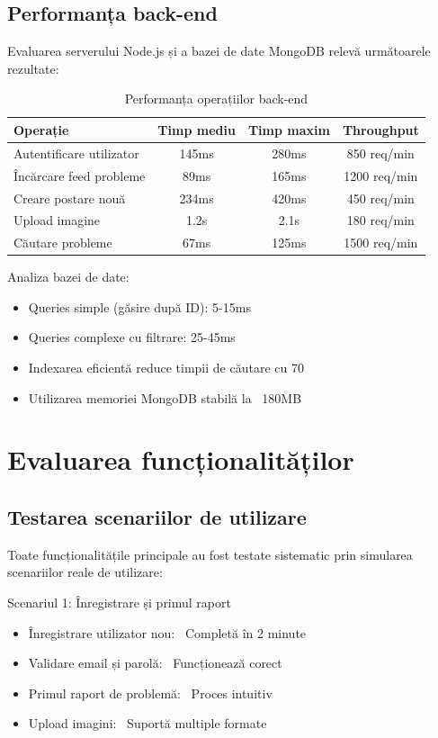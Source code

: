 \documentclass[12pt,a4paper]{report}
\begin{document}
\subsection{Performanța back-end}

Evaluarea serverului Node.js și a bazei de date MongoDB relevă următoarele rezultate:

\begin{table}[H]
\centering
\caption{Performanța operațiilor back-end}
\label{tab:backend_performance}
\begin{tabular}{|l|c|c|c|}
\hline
\textbf{Operație} & \textbf{Timp mediu} & \textbf{Timp maxim} & \textbf{Throughput} \\
\hline
Autentificare utilizator & 145ms & 280ms & 850 req/min \\
\hline
Încărcare feed probleme & 89ms & 165ms & 1200 req/min \\
\hline
Creare postare nouă & 234ms & 420ms & 450 req/min \\
\hline
Upload imagine & 1.2s & 2.1s & 180 req/min \\
\hline
Căutare probleme & 67ms & 125ms & 1500 req/min \\
\hline
\end{tabular}
\end{table}

Analiza bazei de date:
\begin{itemize}
\item Queries simple (găsire după ID): 5-15ms
\item Queries complexe cu filtrare: 25-45ms
\item Indexarea eficientă reduce timpii de căutare cu 70%
\item Utilizarea memoriei MongoDB stabilă la ~180MB
\end{itemize}
\section{Evaluarea funcționalităților}

\subsection{Testarea scenariilor de utilizare}

Toate funcționalitățile principale au fost testate sistematic prin simularea scenariilor reale de utilizare:

Scenariul 1: Înregistrare și primul raport
\begin{itemize}
\item Înregistrare utilizator nou: \checkmark\ Completă în 2 minute
\item Validare email și parolă: \checkmark\ Funcționează corect
\item Primul raport de problemă: \checkmark\ Proces intuitiv
\item Upload imagini: \checkmark\ Suportă multiple formate
\end{itemize}
\end{document}
